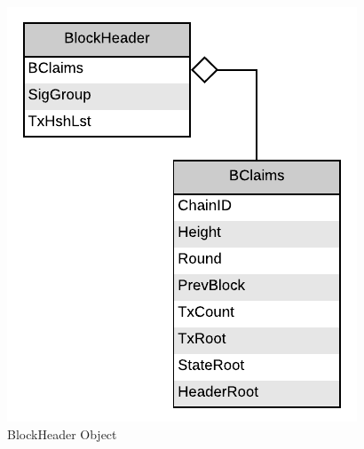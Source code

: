 \begin{figure}[H]
    \centering
    \includegraphics[scale=0.5]{figures/BlockHeader_Object.pdf}
    \caption{BlockHeader Object}
\end{figure}
